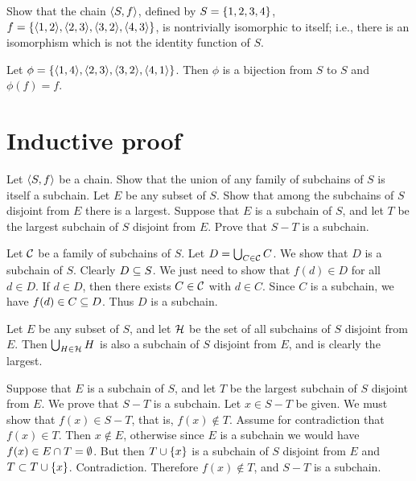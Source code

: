 \begin{exercise}
Show that the chain $\left\langle S, f\right\rangle$, defined by $S = \left\{1, 2,3,4\right\}$,
$f=\set{\aprn{1,2},\aprn{2,3},\aprn{3,2}, \aprn{4,3}}$,
is nontrivially isomorphic to itself; i.e., there is an isomorphism which is not the
identity function of $S$.
\end{exercise}

\begin{solution}
Let $\phi=\set{\aprn{1,4},\aprn{2,3},\aprn{3,2}, \aprn{4,1}}$.
Then $\phi$ is a bijection from $S$ to $S$ and $\phi(f)=f$.
\end{solution}


\section{Inductive proof}
\begin{exercise}
Let $\left\langle S, f\right\rangle$ be a chain. Show that the union of any family of subchains of $S$ is itself
a subchain. Let $E$ be any subset of $S$. Show that among the subchains of $S$ disjoint
from $E$ there is a largest. Suppose that $E$ is a subchain of $S$, and let $T$ be the largest
subchain of $S$ disjoint from $E$. Prove that $S -  T$ is a subchain.
\end{exercise}

\begin{solution}
Let $\mathcal{C}$ be a family of subchains of $S$. Let $D=\bigcup_{C\in\mathcal{C}}C$.
We show that $D$ is a subchain of $S$.
Clearly $D\subseteq S$. We just need to show that $f(d)\in D$ for all $d\in D$.
If $d\in D$, then there exists $C\in \mathcal{C}$ with $d\in C$. Since $C$ is a subchain,
we have $f(d)\in C\subseteq D$.
Thus $D$ is a subchain.

Let $E$ be any subset of $S$, and let $\mathcal{H}$ be the set of all subchains of $S$ disjoint from $E$.
Then $\bigcup_{H\in \mathcal{H}} H$ is also a subchain of $S$ disjoint from $E$, and is clearly the largest.

Suppose that $E$ is a subchain of $S$, and let $T$ be the largest subchain of $S$ disjoint from $E$.
We prove that $S-T$ is a subchain.
Let $x\in S-T$ be given. We must show that $f(x)\in S-T$, that is, $f(x)\nin T$.
Assume for contradiction that $f(x)\in T$. Then $x\nin E$, otherwise since $E$ is a subchain
we would have $f(x)\in E\cap T=\emptyset$. But then $T\cup\left\{x\right\}$
is a subchain of $S$ disjoint from $E$ and $T\subset T\cup\left\{x\right\}$. Contradiction.
Therefore $f(x)\nin T$, and $S-T$ is a subchain.
\end{solution}

